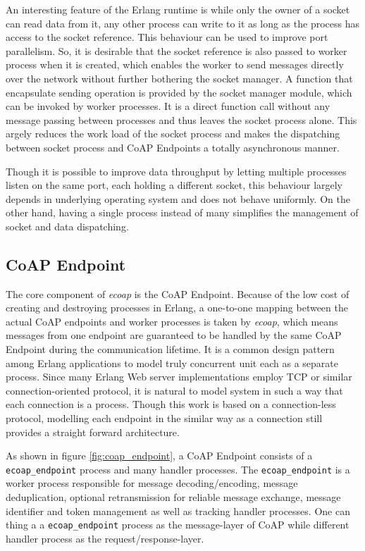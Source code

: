 \begin{figure}
\label{fig:coap_socket_manager}
\end{figure}

An interesting feature of the Erlang runtime is while only the owner of a socket can read data from it, any other process can write to it as long as the process has access to the socket reference. This behaviour can be used to improve port parallelism. So, it is desirable that the socket reference is also passed to worker process when it is created, which enables the worker to send messages directly over the network without further bothering the socket manager. A function that encapsulate sending operation is provided  by the socket manager module, which can be invoked by worker processes. It is a direct function call without any message passing between processes and thus leaves the socket process alone. This argely reduces the work load of the socket process and makes the dispatching between socket process and CoAP Endpoints a totally asynchronous manner.

Though it is possible to improve data throughput by letting multiple processes listen on the same port, each holding a different socket, this behaviour largely depends in underlying operating system and does not behave uniformly. On the other hand, having a single process instead of many simplifies the management of socket and data dispatching.

\subsection{CoAP Endpoint}

The core component of \textit{ecoap} is the CoAP Endpoint. Because of the low cost of creating and destroying processes in Erlang, a one-to-one mapping between the actual CoAP endpoints and worker processes is taken by \textit{ecoap}, which means messages from one endpoint are guaranteed to be handled by the same CoAP Endpoint during the communication lifetime. It is a common design pattern among Erlang applications to model truly concurrent unit each as a separate process. Since many Erlang Web server implementations employ TCP or similar connection-oriented protocol, it is natural to model system in such a way that each connection is a process. Though this work is based on a connection-less protocol, modelling each endpoint in the similar way as a connection still provides a straight forward architecture. 

As shown in figure \ref{fig:coap_endpoint}, a CoAP Endpoint consists of a \verb|ecoap_endpoint| process and many handler processes. The \verb|ecoap_endpoint| is a worker process responsible for message decoding/encoding, message deduplication, optional retransmission for reliable message exchange, message identifier and token management as well as tracking handler processes. One can thing a a \verb|ecoap_endpoint| process as the message-layer of CoAP while different handler process as the request/response-layer. 

